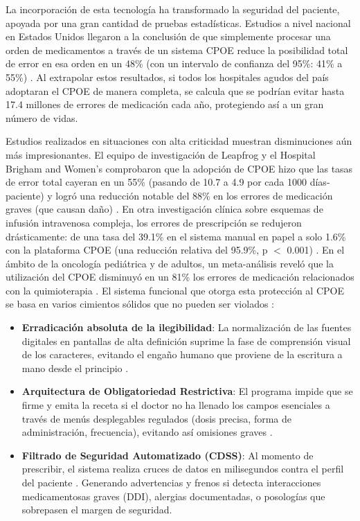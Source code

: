 La incorporación de esta tecnología ha transformado la seguridad del paciente, apoyada por una gran cantidad de pruebas estadísticas. Estudios a nivel nacional en Estados Unidos llegaron a la conclusión de que simplemente procesar una orden de medicamentos a través de un sistema CPOE reduce la posibilidad total de error en esa orden en un 48\% (con un intervalo de confianza del 95\%: 41\% a 55\%) \cite{pmc2013cpoe_reduction}. Al extrapolar estos resultados, si todos los hospitales agudos del país adoptaran el CPOE de manera completa, se calcula que se podrían evitar hasta 17.4 millones de errores de medicación cada año, protegiendo así a un gran número de vidas.

Estudios realizados en situaciones con alta criticidad muestran disminuciones aún más impresionantes. El equipo de investigación de Leapfrog y el Hospital Brigham and Women's comprobaron que la adopción de CPOE hizo que las tasas de error total cayeran en un 55\% (pasando de 10.7 a 4.9 por cada 1000 días-paciente) y logró una reducción notable del 88\% en los errores de medicación graves (que causan daño) \cite{leapfrog2023cpoe}. En otra investigación clínica sobre esquemas de infusión intravenosa compleja, los errores de prescripción se redujeron drásticamente: de una tasa del 39.1\% en el sistema manual en papel a solo 1.6\% con la plataforma CPOE (una reducción relativa del 95.9\%, p $<$ 0.001) \cite{jamia2009cpoe_prescribing}. En el ámbito de la oncología pediátrica y de adultos, un meta-análisis reveló que la utilización del CPOE disminuyó en un 81\% los errores de medicación relacionados con la quimioterapia \cite{pmc2021cpoe_impact}.
El sistema funcional que otorga esta protección al CPOE se basa en varios cimientos sólidos que no pueden ser violados \cite{leapfrog2023cpoe}:
\begin{itemize}
    \item \textbf{Erradicación absoluta de la ilegibilidad}: La normalización de las fuentes digitales en pantallas de alta definición suprime la fase de comprensión visual de los caracteres, evitando el engaño humano que proviene de la escritura a mano desde el principio \cite{leapfrog2023cpoe}.
    \item \textbf{Arquitectura de Obligatoriedad Restrictiva}: El programa impide que se firme y emita la receta si el doctor no ha llenado los campos esenciales a través de menús desplegables regulados (dosis precisa, forma de administración, frecuencia), evitando así omisiones graves \cite{leapfrog2023cpoe}.
    \item \textbf{Filtrado de Seguridad Automatizado (CDSS)}: Al momento de prescribir, el sistema realiza cruces de datos en milisegundos contra el perfil del paciente \cite{leapfrog2023cpoe}. Generando advertencias y frenos si detecta interacciones medicamentosas graves (DDI), alergias documentadas, o posologías que sobrepasen el margen de seguridad.
\end{itemize}

